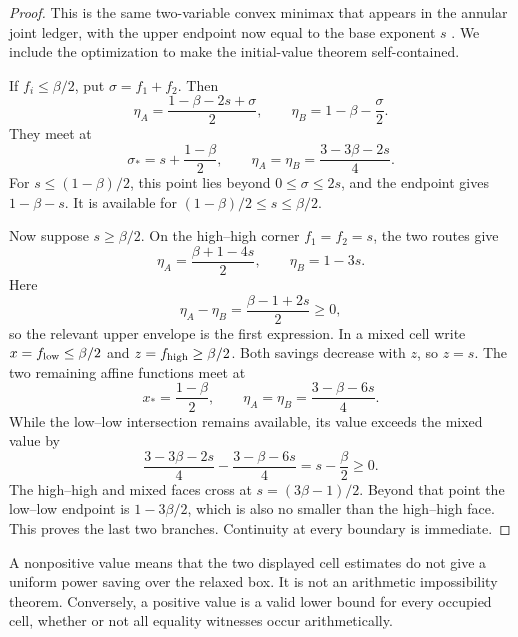\begin{proof}
This is the same two-variable convex minimax that appears in the
annular joint ledger, with the upper endpoint now equal to the base
exponent $s$ \citep{WangTPC26}.  We include the optimization to make
the initial-value theorem self-contained.

If $f_i\le\beta/2$, put $\sigma=f_1+f_2$.  Then
\begin{equation}
 \eta_A=\frac{1-\beta-2s+\sigma}{2},
 \qquad
 \eta_B=1-\beta-\frac\sigma2.
 \label{eq:tpc28-low-low}
\end{equation}
They meet at
\begin{equation}
 \sigma_*=s+\frac{1-\beta}{2},
 \qquad
 \eta_A=\eta_B=\frac{3-3\beta-2s}{4}.
 \label{eq:tpc28-low-witness}
\end{equation}
For $s\le(1-\beta)/2$, this point lies beyond
$0\le\sigma\le2s$, and the endpoint gives $1-\beta-s$.  It is
available for $(1-\beta)/2\le s\le\beta/2$.

Now suppose $s\ge\beta/2$.  On the high--high corner
$f_1=f_2=s$, the two routes give
\begin{equation}
 \eta_A=\frac{\beta+1-4s}{2},
 \qquad \eta_B=1-3s.
 \label{eq:tpc28-high-high}
\end{equation}
Here
\[
 \eta_A-\eta_B=\frac{\beta-1+2s}{2}\ge0,
\]
so the relevant upper envelope is the first expression.  In a mixed cell
write $x=f_{\rm low}\le\beta/2$ and
$z=f_{\rm high}\ge\beta/2$.  Both savings decrease with $z$, so
$z=s$.  The two remaining affine functions meet at
\begin{equation}
 x_*=\frac{1-\beta}{2},
 \qquad
 \eta_A=\eta_B=\frac{3-\beta-6s}{4}.
 \label{eq:tpc28-mixed-witness}
\end{equation}
While the low--low intersection remains available, its value exceeds
the mixed value by
\[
 \frac{3-3\beta-2s}{4}
 -\frac{3-\beta-6s}{4}
 =s-\frac\beta2\ge0.
\]
The high--high and mixed faces cross at
$s=(3\beta-1)/2$.  Beyond that point the low--low endpoint is
$1-3\beta/2$, which is also no smaller than the high--high face.
This proves the last two branches.  Continuity at every boundary is
immediate.
\end{proof}

\begin{remark}
\label{rem:tpc28-minimax-scope}
A nonpositive value means that the two displayed cell estimates do not
give a uniform power saving over the relaxed box.  It is not an
arithmetic impossibility theorem.  Conversely, a positive value is a
valid lower bound for every occupied cell, whether or not all equality
witnesses occur arithmetically.
\end{remark}

